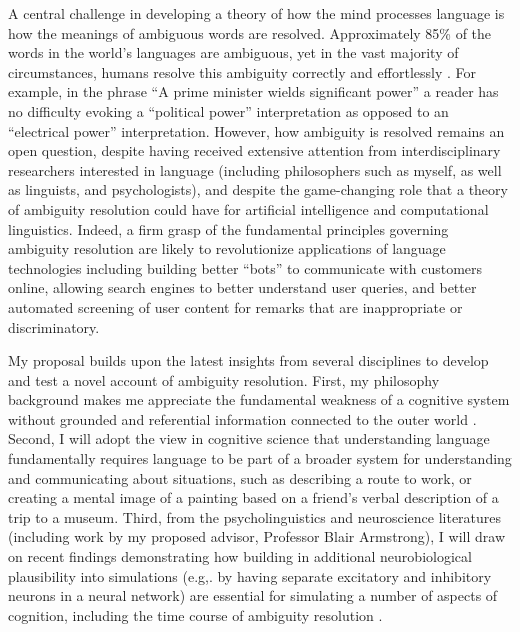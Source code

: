 \documentclass[letterpaper, 12pt]{article}
\begin{document}


A central challenge in developing a theory of how the mind processes language is how the meanings of ambiguous words are resolved. Approximately 85\% of the words in the world's languages are ambiguous, yet in the vast majority of circumstances, humans resolve this ambiguity correctly and effortlessly \citep{KleinRepresentationPolysemousWords2001}.  For example, in the phrase ``A prime minister wields significant power'' a reader has no difficulty evoking a ``political power'' interpretation as opposed to an ``electrical power'' interpretation.  However, how ambiguity is resolved remains an open question, despite having received extensive attention from interdisciplinary researchers interested in language (including philosophers such as myself, as well as linguists, and psychologists), and despite the game-changing role that a theory of ambiguity resolution could have for artificial intelligence and computational linguistics.  Indeed, a firm grasp of the fundamental principles governing ambiguity resolution are likely to revolutionize applications of language technologies including building better ``bots'' to communicate with customers online, allowing search engines to better understand user queries, and better automated screening of user content for remarks that are inappropriate or discriminatory.  

My proposal builds upon the latest insights from several disciplines to develop and test a novel account of ambiguity resolution. First, my philosophy background makes me appreciate the fundamental weakness of a cognitive system without grounded and referential information connected to the outer world \citep{harnadSymbolGroundingProblem1990, searleMindsBrainsPrograms1980}. Second, I will adopt the view in cognitive science that understanding language fundamentally requires language to be part of a broader system for understanding and communicating about situations, such as describing a route to work, or creating a mental image of a painting based on a friend's verbal description of a trip to a museum.  Third, from the psycholinguistics and neuroscience literatures (including work by my proposed advisor, Professor Blair Armstrong), I will draw on recent findings demonstrating how building in additional neurobiological plausibility into simulations (e.g,. by having separate excitatory and inhibitory neurons in a neural network) are essential for simulating a number of aspects of cognition, including the time course of ambiguity resolution \citep{Armstrong2016Disparatesemanticambiguity}.
\end{document}
